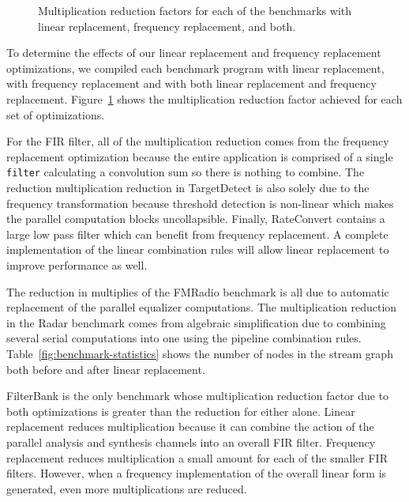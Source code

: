 \begin{figure}
\center
\epsfxsize=3.2in
\vspace{-6pt}
\caption{Multiplication reduction factors for each of the benchmarks with linear replacement, frequency replacement, and both.}
\label{fig:linear-freq-both}
\vspace{-12pt}
\end{figure}

To determine the effects of our linear replacement and frequency replacement 
optimizations, we compiled each benchmark program with linear 
replacement, with frequency replacement and with both linear 
replacement and frequency replacement. 
Figure~\ref{fig:linear-freq-both} shows the multiplication reduction factor 
achieved for each set of optimizations.

For the FIR filter, all of the multiplication reduction comes from the frequency
replacement optimization because the entire application is comprised of a single
{\tt filter} calculating a convolution sum so there is nothing to combine.
The reduction multiplication reduction in TargetDetect is also solely due to 
the frequency transformation because threshold detection is non-linear which
makes the parallel computation blocks uncollapsible. Finally, RateConvert contains
a large low pass filter which can benefit from frequency replacement. A complete
implementation of the linear combination rules will allow linear replacement 
to improve performance as well.

The reduction in multiplies of the FMRadio benchmark is all due to
automatic replacement of the parallel equalizer computations.
The multiplication reduction in the Radar benchmark comes from algebraic  
simplification due to combining several serial computations into one using
the pipeline combination rules. Table~\ref{fig:benchmark-statistics} shows
the number of nodes in the stream graph both before and after linear replacement. 

FilterBank is the only benchmark whose multiplication reduction factor due to both optimizations
is greater than the reduction for either alone. Linear replacement reduces
multiplication because it can combine the action of the parallel analysis 
and synthesis channels into an overall FIR filter. Frequency replacement reduces
multiplication a small amount for each of the smaller FIR filters. However, when
a frequency implementation of the overall linear form is generated,
even more multiplications are reduced.

